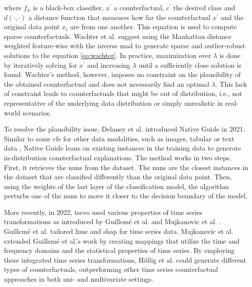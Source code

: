 where $f_{w}$ is a black-box classifier, $x^{\prime}$ a counterfactual, $c^{\prime}$ the desired class and $d(\cdot, \cdot)$ a distance function that measures how far the counterfactual $x^{\prime}$ and the original data point $x_{i}$ are from one another. This equation is used to compute sparse counterfactuals. Wachter et al. \cite{wachter_counterfactual_2018} suggest using the Manhattan distance weighted feature-wise with the inverse \gls{mad} to generate sparse and outlier-robust solutions to the equation \ref{eq:wachter}.
In practice, maximization over $\lambda$ is done by iteratively solving for $x^{\prime}$ and increasing $\lambda$ until a sufficiently close solution is found. Wachter's method, however, imposes no constraint on the plausibility of the obtained counterfactual and does not necessarily find an optimal $\lambda$. This lack of constraint leads to counterfactuals that might be out of distribution, i.e., not representative of the underlying data distribution or simply unrealistic in real-world scenarios.

To resolve the plausibility issue, Delaney et al. \cite{delaney_instance-based_2021} introduced Native Guide in 2021. Similar to some \gls{cfe} for other data modalities, such as images, tabular or text data \cite{keane_good_2020, kenny_twin-systems_2019, hollig_tsevo_2022, nugent_gaining_2009, leake_introduction_2005}, Native Guide leans on existing instances in the training data to generate in-distribution counterfactual explanations. The method works in two steps. First, it retrieves the \gls{nuns} from the dataset. The \gls{nuns} are the closest instances in the dataset that are classified differently than the original data point.
Then, using the weights of the last layer of the classification model, the algorithm perturbs one of the \gls{nuns} to move it closer to the decision boundary of the model.

 More recently, in 2022, \gls{tsevo} \cite{hollig_tsevo_2022} used various properties of time series transformations as introduced by Guillemé et al. \cite{guilleme_agnostic_2019} and Mujkanovic et al. \cite{mujkanovic_timexplain_2023}. Guillemé et al. \cite{guilleme_agnostic_2019} tailored \gls{lime} \cite{ribeiro_why_2016} and \gls{shap} \cite{lundberg_unified_2017} for time series data. Mujkanovic et al. \cite{mujkanovic_timexplain_2023} extended Guillemé et al.'s work by creating mappings that utilize the time and frequency domains and the statistical properties of time series. By employing these integrated time series transformations, Höllig et al. \cite{hollig_tsevo_2022} could generate different types of counterfactuals, outperforming other time series counterfactual approaches in both uni- and multivariate settings.
